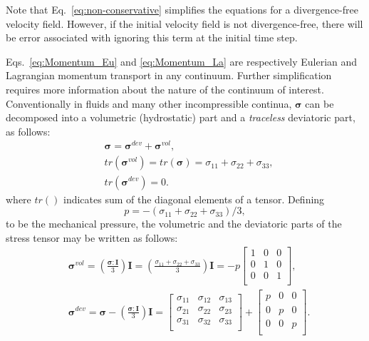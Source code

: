 Note that Eq.~\ref{eq:non-conservative} simplifies the equations for a divergence-free velocity field. However, if the initial velocity field is not divergence-free, there will be error associated with ignoring this term at the initial time step.
 
Eqs.~\ref{eq:Momentum_Eu} and \ref{eq:Momentum_La} are respectively  Eulerian and Lagrangian momentum transport in any continuum. Further simplification requires more information about the nature of the continuum of interest. 
Conventionally in fluids and many other incompressible continua, $\bm{\sigma}$ can be decomposed into a volumetric (hydrostatic) part and a \textit{traceless} deviatoric part, as follows:
\begin{align}
&\bm{\sigma}=\bm{\sigma}^{dev}+\bm{\sigma}^{vol}\label{eq:stress_decomp},\\
&tr(\bm{\sigma}^{vol})=tr(\bm{\sigma})=\sigma_{11}+\sigma_{22}+\sigma_{33},\\
&tr(\bm{\sigma}^{dev})=0.
\end{align}
where $tr( )$ indicates sum of the diagonal elements of a tensor. Defining 
\begin{equation}
p=-({\sigma_{11}+\sigma_{22}+\sigma_{33}})/{3},\label{eq:stress_p}
\end{equation}
to be the mechanical pressure, the volumetric and the deviatoric parts of the stress tensor may be written as follows:
\begin{align}
&\bm{\sigma}^{vol}=(\frac{\bm{\sigma}: \mathbf{I}}{3}) \mathbf{I}=(\frac{\sigma_{11}+\sigma_{22}+\sigma_{33}}{3}) \mathbf{I}=
-p
\begin{bmatrix}
1& 0& 0\\
0&1&0\\
0&0&1\\
\end{bmatrix},\label{eq:sigma_vol}\\
&\bm{\sigma}^{dev}=\bm{\sigma}-(\frac{\bm{\sigma}: \mathbf{I}}{3}) \mathbf{I}=
\begin{bmatrix}
\sigma_{11}& \sigma_{12}& \sigma_{13}\\
\sigma_{21}& \sigma_{22}& \sigma_{23}\\
\sigma_{31}& \sigma_{32}& \sigma_{33}\\
\end{bmatrix}+
\begin{bmatrix}
p& 0& 0\\
0&p&0\\
0&0&p\\
\end{bmatrix}.
\label{eq:sigma_dev}
\end{align}
